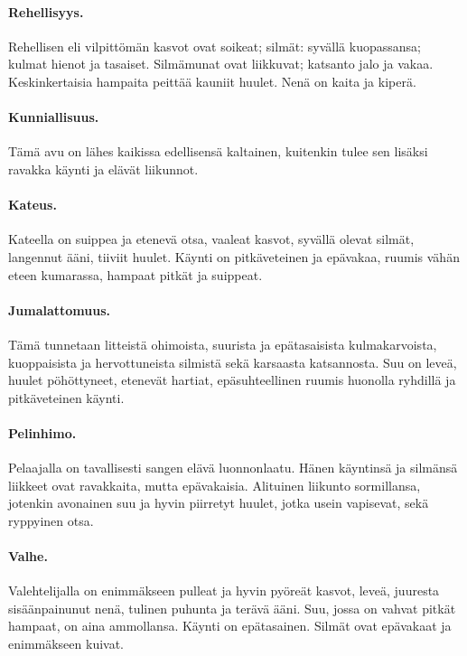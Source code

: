 \documentclass[11pt, twoside, finnish, a5paper]{book}
\begin{document}
\paragraph{Rehellisyys.}
Rehellisen eli vilpittömän  kasvot ovat soikeat; silmät:
syvällä kuopassansa; kulmat hienot ja tasaiset.
Silmämunat ovat liikkuvat; katsanto jalo ja vakaa. 
Keskinkertaisia hampaita peittää kauniit huulet. Nenä on
kaita ja kiperä.

\paragraph{Kunniallisuus.}
Tämä avu on lähes kaikissa edellisensä kaltainen, kuitenkin tulee sen lisäksi ravakka käynti ja elävät liikunnot.

\paragraph{Kateus.}
Kateella on suippea ja etenevä otsa, vaaleat kasvot,
syvällä olevat silmät, langennut ääni, tiiviit huulet.
Käynti on pitkäveteinen ja epävakaa, ruumis vähän
eteen kumarassa, hampaat pitkät ja suippeat.

\paragraph{Jumalattomuus.}
Tämä tunnetaan litteistä ohimoista, suurista ja
epätasaisista kulmakarvoista, kuoppaisista ja hervottuneista
silmistä sekä karsaasta katsannosta. Suu on leveä, huulet
pöhöttyneet, etenevät hartiat, epäsuhteellinen
ruumis huonolla ryhdillä ja pitkäveteinen käynti.

\paragraph{Pelinhimo.}
Pelaajalla on tavallisesti sangen elävä luonnonlaatu.
Hänen käyntinsä ja silmänsä liikkeet ovat ravakkaita,
mutta epävakaisia. Alituinen liikunto sormillansa, jotenkin
avonainen suu ja hyvin piirretyt huulet, jotka usein
vapisevat, sekä ryppyinen otsa.

\paragraph{Valhe.}
Valehtelijalla on enimmäkseen pulleat ja hyvin pyöreät
kasvot, leveä, juuresta sisäänpainunut nenä, tulinen
puhunta ja terävä ääni. Suu, jossa on vahvat pitkät
hampaat, on aina ammollansa. Käynti on epätasainen.
Silmät ovat epävakaat ja enimmäkseen kuivat.
\end{document}
